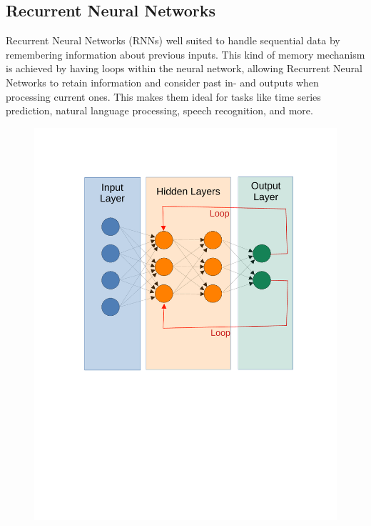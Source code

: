 \documentclass[12pt, a4paper, titlepage]{report}
\begin{document}
\subsection{Recurrent Neural Networks}

Recurrent Neural Networks (RNNs) well suited to handle sequential data by remembering information about previous inputs. This kind of memory mechanism is achieved by having loops within the neural network, allowing Recurrent Neural Networks to retain information and consider past in- and outputs when processing current ones. This makes them ideal for tasks like time series prediction, natural language processing, speech recognition, and more.

\begin{figure}
	\centering
	\includegraphics[width=1.0\textwidth]{../rc/images/rnn_architecture.pdf}
	\label{fig:rnn_architecture}
\end{figure}
\end{document}
